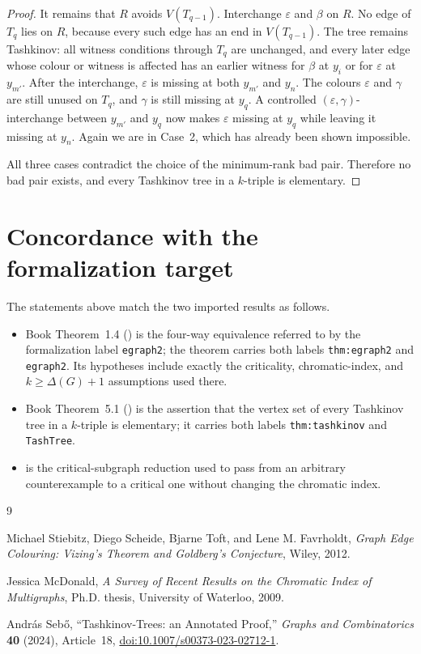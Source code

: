 \documentclass[11pt]{article}
\theoremstyle{definition}
\begin{document}
\begin{proof}
It remains that $R$ avoids $V(T_{q-1})$.  Interchange $\varepsilon$ and
$\beta$ on $R$.  No edge of $T_q$ lies on $R$, because every such edge has an
end in $V(T_{q-1})$.  The tree remains Tashkinov: all witness conditions
through $T_q$ are unchanged, and every later edge whose colour or witness is
affected has an earlier witness for $\beta$ at $y_i$ or for $\varepsilon$ at
$y_{m'}$.  After the interchange, $\varepsilon$ is missing at both
$y_{m'}$ and $y_n$.  The colours $\varepsilon$ and $\gamma$ are still unused
on $T_q$, and $\gamma$ is still missing at $y_q$.  A controlled
$(\varepsilon,\gamma)$-interchange between $y_{m'}$ and $y_q$ now makes
$\varepsilon$ missing at $y_q$ while leaving it missing at $y_n$.  Again we
are in Case~2, which has already been shown impossible.

All three cases contradict the choice of the minimum-rank bad pair.  Therefore
no bad pair exists, and every Tashkinov tree in a $k$-triple is elementary.
\end{proof}

\section{Concordance with the formalization target}

The statements above match the two imported results as follows.
\begin{itemize}[leftmargin=2em]
  \item Book Theorem~1.4 () is the four-way equivalence
  referred to by the formalization label \texttt{egraph2}; the theorem carries both labels
  \texttt{thm:egraph2} and \texttt{egraph2}.  Its hypotheses include exactly the
  criticality, chromatic-index, and $k\ge\Delta(G)+1$ assumptions used there.
  \item Book Theorem~5.1 () is the assertion that the
  vertex set of every Tashkinov tree in a $k$-triple is elementary; it carries both labels
  \texttt{thm:tashkinov} and \texttt{TashTree}.
  \item {} is the critical-subgraph reduction used to
  pass from an arbitrary counterexample to a critical one without changing
  the chromatic index.
\end{itemize}

\begin{thebibliography}{9}

Michael Stiebitz, Diego Scheide, Bjarne Toft, and Lene M. Favrholdt,
\emph{Graph Edge Colouring: Vizing's Theorem and Goldberg's Conjecture},
Wiley, 2012.

Jessica McDonald,
\emph{A Survey of Recent Results on the Chromatic Index of Multigraphs},
Ph.D. thesis, University of Waterloo, 2009.

Andr\'as Seb\H{o},
``Tashkinov-Trees: an Annotated Proof,''
\emph{Graphs and Combinatorics} \textbf{40} (2024), Article~18,
\href{https://doi.org/10.1007/s00373-023-02712-1}{doi:10.1007/s00373-023-02712-1}.

\end{thebibliography}
\end{document}
